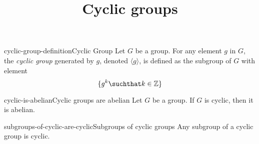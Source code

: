 \documentclass[preview]{standalone}
\begin{document}
\title{Cyclic groups}
\genpage

\begin{snippetdefinition}{cyclic-group-definition}{Cyclic Group}
    Let \(G\) be a group. For any element \(g\) in \(G\),
    the \textit{cyclic group} generated by \(g\), denoted \(\langle g \rangle\),
    is defined as the subgroup of \(G\) with element
    \[
        \{ g^k \suchthat k \in \mathbb{Z} \}
    \]
\end{snippetdefinition}

\begin{snippetcorollary}{cyclic-is-abelian}{Cyclic groups are abelian}
    Let \(G\) be a group. If \(G\) is cyclic, then it is abelian.
\end{snippetcorollary}


\begin{snippettheorem}{subgroups-of-cyclic-are-cyclic}{Subgroups of cyclic groups}
    Any subgroup of a cyclic group is cyclic.
\end{snippettheorem}
\end{document}
